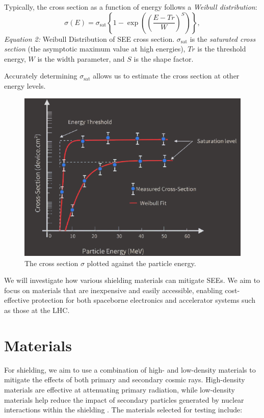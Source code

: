 \documentclass{article}
\begin{document}
Typically, the cross section as a function of energy follows a \textit{Weibull distribution}:
\begin{equation}
    \sigma(E) = \sigma_{\text{sat}} \left\{1 - \exp\left(\left(\frac{E - {T\!r}}{W}\right)^S\right)\right\}, \tag{2}
\end{equation}
\textit{Equation 2:} Weibull Distribution of SEE cross section. $\sigma_{\text{sat}}$ is the \textit{saturated cross section} (the asymptotic maximum value at high energies), $T\!r$ is the threshold energy, $W$ is the width parameter, and $S$ is the shape factor.

Accurately determining $\sigma_{\text{sat}}$ allows us to estimate the cross section at other energy levels.
\begin{figure}[H]
    \centering
    \includegraphics[width=0.5\linewidth]{./graph.png}
    \caption{The cross section $\sigma$ plotted against the particle energy.}
    \label{fig:cross-section}
\end{figure}
We will investigate how various shielding materials can mitigate SEEs. We aim to focus on materials that are inexpensive and easily accessible, enabling cost-effective protection for both spaceborne electronics and accelerator systems such as those at the LHC.

\newpage


\newpage
\vspace*{-5.5em}
\part{Materials}

For shielding, we aim to use a combination of high- and low-density materials to mitigate the effects of both primary and secondary cosmic rays. High-density materials are effective at attenuating primary radiation, while low-density materials help reduce the impact of secondary particles generated by nuclear interactions within the shielding . The materials selected for testing include:
\end{document}
